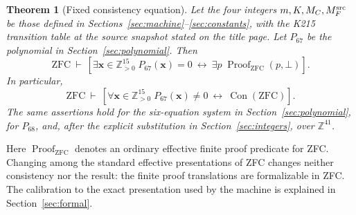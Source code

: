 \documentclass[11pt,a4paper]{article}
\newtheorem{theorem}{Theorem}[section]
\theoremstyle{definition}
\theoremstyle{remark}
\newcommand{\Z}{\mathbb Z}
\newcommand{\Pos}{\mathbb Z_{>0}}
\newcommand{\Con}{\operatorname{Con}}
\newcommand{\Pbase}{P_{67}}
\newcommand{\Plow}{P_{68}}
\begin{document}
\begin{theorem}[Fixed consistency equation]\label{thm:main}
Let the four integers \(m,K,M_C,M_F^{\rm src}\) be those defined in
Sections~\ref{sec:machine}--\ref{sec:constants}, with the K215 transition
table at the source snapshot stated on the title page. Let \(\Pbase\) be
the polynomial in Section~\ref{sec:polynomial}. Then
\[
 \mathrm{ZFC}\ \vdash\
 \left[
  \exists \mathbf x\in\Pos^{15}\;\Pbase(\mathbf x)=0
  \ \longleftrightarrow\
  \exists p\;\operatorname{Proof}_{\mathrm{ZFC}}(p,\bot)
 \right].
 \tag{1}\label{eq:mainexist}
\]
In particular,
\[
 \mathrm{ZFC}\ \vdash\
 \left[
  \forall\mathbf x\in\Pos^{15}\;\Pbase(\mathbf x)\ne0
  \ \longleftrightarrow\ \Con(\mathrm{ZFC})
 \right].
 \tag{2}\label{eq:mainno}
\]
The same assertions hold for the six-equation system in
Section~\ref{sec:polynomial}, for \(\Plow\), and, after the explicit
substitution in Section~\ref{sec:integers}, over \(\Z^{41}\).
\end{theorem}
Here \(\operatorname{Proof}_{\mathrm{ZFC}}\) denotes an ordinary effective
finite proof predicate for ZFC. Changing among the standard effective
presentations of ZFC changes neither consistency nor the result: the
finite proof translations are formalizable in ZFC. The calibration to
the exact presentation used by the machine is explained in
Section~\ref{sec:formal}.
\end{document}
